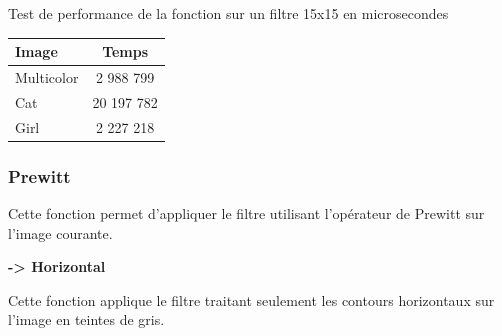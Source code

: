 \documentclass{article}
\begin{document}
\begin{center}
\medbreak
Test de performance de la fonction sur un filtre 15x15 en microsecondes
\bigbreak
   \begin{tabular}{ | l | c | }
     \hline
     Image & Temps \\
     \hline
     Multicolor & 2 988 799 \\
     \hline
     Cat & 20 197 782 \\
     \hline
     Girl & 2 227 218 \\
     \hline
   \end{tabular}
 \end{center}
\bigbreak

\subsubsection{Prewitt}

Cette fonction permet d'appliquer le filtre utilisant l'opérateur de Prewitt sur l'image courante.

\bigbreak
\textbf{-> Horizontal}

Cette fonction applique le filtre traitant seulement les contours horizontaux sur l'image en teintes de gris.
\end{document}
